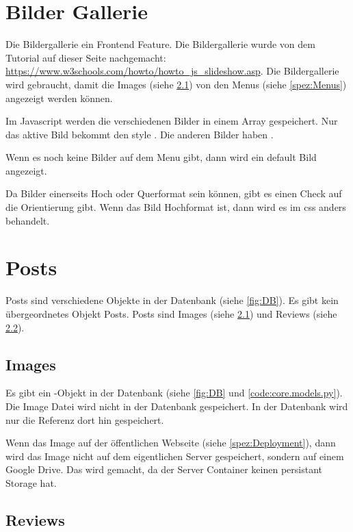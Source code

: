 \section{Bilder Gallerie} \label{spez:Gallerie}

Die Bildergallerie ein Frontend Feature. Die Bildergallerie wurde von dem
Tutorial auf dieser Seite nachgemacht:
\url{https://www.w3schools.com/howto/howto_js_slideshow.asp}. Die Bildergallerie
wird gebraucht, damit die Images (siehe \ref{spez:Images}) von den Menus (siehe
\ref{spez:Menus}) angezeigt werden können.

Im Javascript werden die verschiedenen Bilder in einem Array gespeichert. Nur
das aktive Bild bekommt den style . Die anderen Bilder
haben .

Wenn es noch keine Bilder auf dem Menu gibt, dann wird ein default Bild
angezeigt.

Da Bilder einerseits Hoch oder Querformat sein können, gibt es einen Check auf
die Orientierung gibt. Wenn das Bild Hochformat ist, dann wird es im css anders
behandelt.

\section{Posts} \label{spez:Posts}

Posts sind verschiedene Objekte in der Datenbank (siehe \ref{fig:DB}). Es gibt
kein übergeordnetes Objekt Posts. Posts sind Images (siehe \ref{spez:Images})
und Reviews (siehe \ref{spez:Reviews}).

\subsection{Images} \label{spez:Images}

Es gibt ein -Objekt in der Datenbank (siehe \ref{fig:DB} und
\ref{code:core.models.py}). Die Image Datei wird nicht in der Datenbank
gespeichert. In der Datenbank wird nur die Referenz dort hin gespeichert.

Wenn das Image auf der öffentlichen Webseite (siehe \ref{spez:Deployment}), dann
wird das Image nicht auf dem eigentlichen Server gespeichert, sondern auf einem
Google Drive. Das wird gemacht, da der Server Container keinen persistant
Storage hat.

\subsection{Reviews} \label{spez:Reviews}

